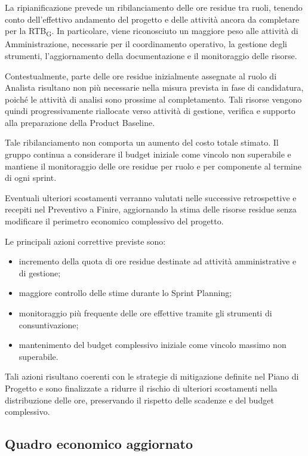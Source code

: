 La ripianificazione prevede un ribilanciamento delle ore residue tra ruoli,
tenendo conto dell'effettivo andamento del progetto e delle attività ancora da
completare per la RTB\textsubscript{G}. In particolare, viene riconosciuto un
maggiore peso alle attività di Amministrazione, necessarie per il coordinamento
operativo, la gestione degli strumenti, l'aggiornamento della documentazione e il
monitoraggio delle risorse.

Contestualmente, parte delle ore residue inizialmente assegnate al ruolo di
Analista risultano non più necessarie nella misura prevista in fase di
candidatura, poiché le attività di analisi sono prossime al completamento.
Tali risorse vengono quindi progressivamente riallocate verso attività di
gestione, verifica e supporto alla preparazione della Product Baseline.

Tale ribilanciamento non comporta un aumento del costo totale stimato. Il gruppo
continua a considerare il budget iniziale come vincolo non superabile e mantiene
il monitoraggio delle ore residue per ruolo e per componente al termine di ogni
sprint.

Eventuali ulteriori scostamenti verranno valutati nelle successive
retrospettive e recepiti nel Preventivo a Finire, aggiornando la stima delle
risorse residue senza modificare il perimetro economico complessivo del progetto.

Le principali azioni correttive previste sono:
\begin{itemize}
    \item incremento della quota di ore residue destinate ad attività amministrative e di gestione;
    \item maggiore controllo delle stime durante lo Sprint Planning;
    \item monitoraggio più frequente delle ore effettive tramite gli strumenti di consuntivazione;
    \item mantenimento del budget complessivo iniziale come vincolo massimo non superabile.
\end{itemize}

Tali azioni risultano coerenti con le strategie di mitigazione definite nel Piano di Progetto e sono finalizzate 
a ridurre il rischio di ulteriori scostamenti nella distribuzione delle ore, preservando il rispetto delle scadenze 
e del budget complessivo.

\subsection{Quadro economico aggiornato}

